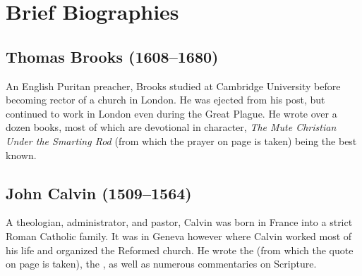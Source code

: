 \documentclass[00-main.tex]{subfiles}
\begin{document}
\chapter{Brief Biographies}

\section{Thomas Brooks (1608--1680)}

An English Puritan preacher, Brooks studied at Cambridge University before becoming rector of a church in London. He was ejected from his post, but continued to work in London even during the Great Plague. He wrote over a dozen books, most of which are devotional in character, {\em The Mute Christian Under the Smarting Rod} (from which the prayer on page \pageref{q1prayer} is taken) being the best known.

\section{John Calvin (1509--1564)}

A theologian, administrator, and pastor, Calvin was born in France into a strict Roman Catholic family. It was in Geneva however where Calvin worked most of his life and organized the Reformed church. He wrote the  (from which the quote on page \pageref{q1comment} is taken), the , as well as numerous commentaries on Scripture.
\end{document}
